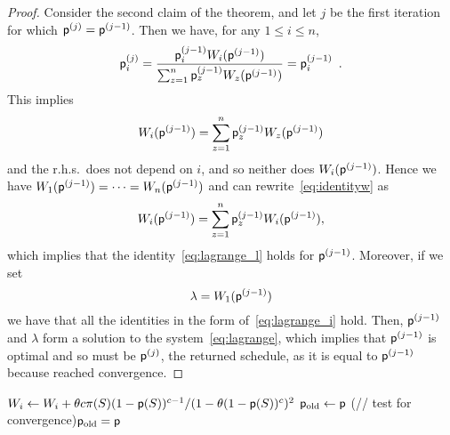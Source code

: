 \begin{proof}
	Consider the second claim of the theorem, and let $j$ be the
	first iteration for which $\mathsf{p}^{(j)}=\mathsf{p}^{(j-1)}$. Then we have, for
	any $1\le i\le n$,
	\[
		\mathsf{p}^{(j)}_i = \frac{\mathsf{p}^{(j-1)}_i W_i(\mathsf{p}^{(j-1)})}{\sum_{z=1}^n
		\mathsf{p}^{(j-1)}_z W_z(\mathsf{p}^{(j-1)})} = \mathsf{p}^{(j-1)}_i\enspace.
	\]
	This implies
	\begin{equation}\label{eq:identityw}
		W_i(\mathsf{p}^{(j-1)}) = \sum_{z=1}^n \mathsf{p}^{(j-1)}_z W_z(\mathsf{p}^{(j-1)})
	\end{equation}
	and the r.h.s.~does not depend on $i$, and so neither does
	$W_i(\mathsf{p}^{(j-1)})$. Hence we have
	$W_1(\mathsf{p}^{(j-1)})=\dotsb=W_n(\mathsf{p}^{(j-1)})$ and can
	rewrite~\eqref{eq:identityw} as
	\[
		W_i(\mathsf{p}^{(j-1)}) =  \sum_{z=1}^n \mathsf{p}^{(j-1)}_z
		W_i(\mathsf{p}^{(j-1)}),
	\]
	which implies that the identity~\eqref{eq:lagrange_l} holds for
	$\mathsf{p}^{(j-1)}$. Moreover, if we set
	\[
		\lambda = W_1(\mathsf{p}^{(j-1)})
	\]
	we have that all the identities in the form of~\eqref{eq:lagrange_i} hold.
	Then, $\mathsf{p}^{(j-1)}$ and $\lambda$ form a solution to the
	system~\eqref{eq:lagrange}, which implies that $\mathsf{p}^{(j-1)}$ is optimal
	and so must be $\mathsf{p}^{(j)}$, the returned schedule, as it is equal to
	$\mathsf{p}^{(j-1)}$ because \algoname reached convergence.
\end{proof}

\begin{algorithm}[ht]
	\DontPrintSemicolon
	 {
		 {\label{algline:sum}
			 {
				$W_i \leftarrow W_i + \theta c \pi(S) (1-\mathsf{p}(S))^{c-1}/(1-\theta(1-\mathsf{p}(S))^c)^2$\label{algline:w}\;
			}
		}
		$\mathsf{p}_{\mathrm{old}}\leftarrow \mathsf{p}$\;
		\If(// test for convergence){$\mathsf{p}_{\mathrm{old}} = \mathsf{p}$} {
			\KwBreak\;
		}
	}
	\Return{$\sched$}\;
	\caption{\algoname}
	\label{alg:iterative}
\end{algorithm}

